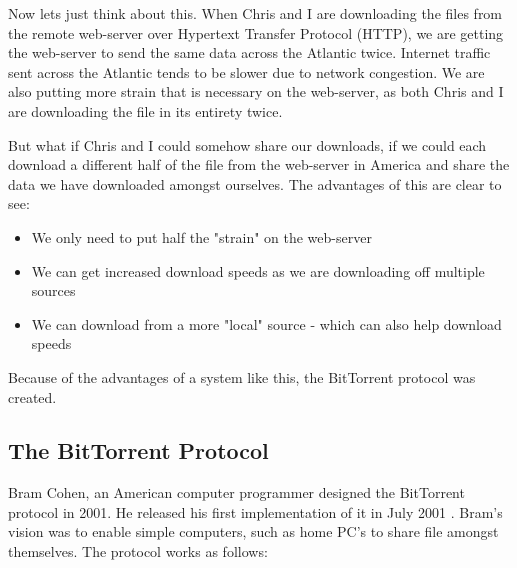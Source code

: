 Now lets just think about this. When Chris and I are downloading the files from the remote web-server over Hypertext Transfer Protocol (HTTP), we are getting the web-server to send the same data across the Atlantic twice. Internet traffic sent across the Atlantic tends to be slower due to network congestion. We are also putting more strain that is necessary on the web-server, as both Chris and I are downloading the file in its entirety twice. 

But what if Chris and I could somehow share our downloads, if we could each download a different half of the file from the web-server in America and share the data we have downloaded amongst ourselves. The advantages of this are clear to see: 

\begin{itemize}
\item We only need to put half the "strain" on the web-server
\item We can get increased download speeds as we are downloading off multiple sources
\item We can download from a more "local" source - which can also help download speeds
\end{itemize}

Because of the advantages of a system like this, the BitTorrent protocol was created.

\subsection{The BitTorrent Protocol}
Bram Cohen, an American computer programmer designed the BitTorrent protocol in 2001. He released his first implementation of it in July 2001 \citep{Reference4}. Bram's vision was to enable simple computers, such as home PC's to share file amongst themselves. The protocol works as follows:

